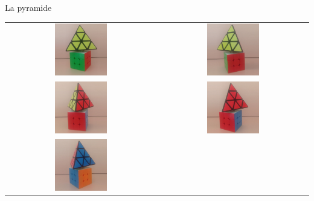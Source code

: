 \begin{frame}{La pyramide}
\begin{minipage}{0.40\textwidth}
    \centering
    \setlength{\tabcolsep}{0pt}
    \renewcommand{\arraystretch}{0}
    \begin{tabular}{cc}
        \includegraphics[width=0.36\textwidth]{capture/pyra0.jpg} &
        \includegraphics[width=0.36\textwidth]{capture/pyra1.jpg} \\ 
        \includegraphics[width=0.36\textwidth]{capture/pyra2.jpg} &
        \includegraphics[width=0.36\textwidth]{capture/pyra3.jpg} \\
        \includegraphics[width=0.36\textwidth]{capture/pyra4.jpg} &

\end{tabular}
\end{minipage}
\end{frame}
